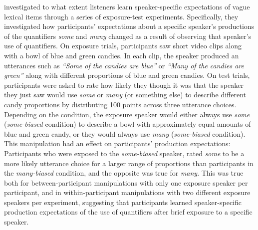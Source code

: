 \textcite{Yildirim2016} investigated to what extent listeners learn speaker-specific expectations of vague lexical items through a series of exposure-test experiments.
Specifically, they investigated how participants' expectations about a specific speaker's productions of the quantifiers \textit{some} and \textit{many} changed
as a result of observing that speaker's use of quantifiers. On exposure trials, participants saw short video clips along with a bowl of blue and green candies.
In each clip, the speaker produced an utterances such as \textit{``Some of the candies are blue''} or \textit{``Many of the candies are green''} along with different proportions
of blue and green candies. On test trials, participants were asked to rate how likely they though it was that the speaker they just saw would use \textit{some} or \textit{many} (or something else)
to describe different candy proportions by distributing 100 points across three utterance choices. 
Depending on the condition, the exposure speaker would either always use \textit{some} (\textit{some-biased} condition)  to describe a bowl with approximately 
equal amounts of blue and green candy, or they would always use \textit{many}  (\textit{some-biased} condition). This manipulation had an effect on participants' production
expectations: Participants who were exposed to the \textit{some-biased} speaker, rated \textit{some} to be a more likely utterance choice for a larger range of proportions than
participants in the \textit{many-biased} condition, and the opposite was true for \textit{many}. This was true both for between-participant manipulations with only one exposure speaker per participant,
 and in within-participant manipulations with two different exposure speakers per experiment, suggesting that participants learned speaker-specific production expectations of the use of quantifiers after
 brief exposure to a specific speaker.

